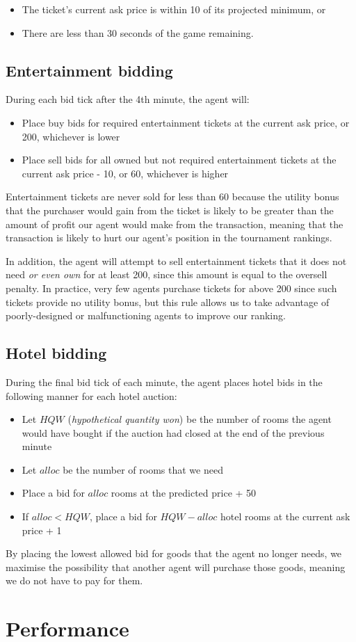 \documentclass[a4paper]{proc}
\begin{document}
\begin{itemize}
  \item The ticket's current ask price is within 10 of its projected minimum, or
  \item There are less than 30 seconds of the game remaining.
\end{itemize}

\subsection{Entertainment bidding}

During each bid tick after the 4th minute, the agent will:

\begin{itemize}
  \item Place buy bids for required entertainment tickets at the current ask price, or 200, whichever is lower
  \item Place sell bids for all owned but not required entertainment tickets at the current ask price - 10, or 60, whichever is higher
\end{itemize}

Entertainment tickets are never sold for less than 60 because the utility bonus that the purchaser would gain from the ticket is likely to be greater than the amount of profit our agent would make from the transaction, meaning that the transaction is likely to hurt our agent's position in the tournament rankings.

In addition, the agent will attempt to sell entertainment tickets that it does not need \emph{or even own} for at least 200, since this amount is equal to the oversell penalty. In practice, very few agents purchase tickets for above 200 since such tickets provide no utility bonus, but this rule allows us to take advantage of poorly-designed or malfunctioning agents to improve our ranking.

\subsection{Hotel bidding}

During the final bid tick of each minute, the agent places hotel bids in the following manner for each hotel auction:

\begin{itemize}
  \item Let $HQW$ (\emph{hypothetical quantity won}) be the number of rooms the agent would have bought if the auction had closed at the end of the previous minute
  \item Let $alloc$ be the number of rooms that we need
  \item Place a bid for $alloc$ rooms at the predicted price + 50
  \item If $alloc < HQW$, place a bid for $HQW - alloc$ hotel rooms at the current ask price + 1
\end{itemize}

By placing the lowest allowed bid for goods that the agent no longer needs, we maximise the possibility that another agent will purchase those goods, meaning we do not have to pay for them.

\section{Performance}
\end{document}
